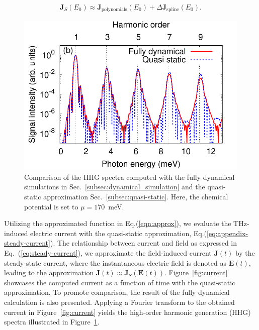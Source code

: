 \begin{align}
	\mathbf J_S(E_0)\approx \mathbf{J}_{\mathrm{polynomials }}(E_0)+\Delta \mathbf{J}_{\mathrm{spline}}(E_0).
	\label{eqn:approx}
\end{align}

\begin{figure}[htbp]
	\centering
	\includegraphics[width=0.8\linewidth]{pic/hhg_qstatic.pdf}
	\caption{\label{fig:hhg_qstatic}
		Comparison of the HHG spectra computed with the fully dynamical simulations in Sec.~\ref{subsec:dynamical_simulation} and the quasi-static approximation Sec.~\ref{subsec:quasi-static}. Here, the chemical potential is set to $\mu =170$~meV.}
\end{figure}

Utilizing the approximated function in Eq.(\ref{eqn:approx}), we evaluate the THz-induced electric
current with the quasi-static approximation, Eq.(\ref{eq:appendix-steady-current}).
The relationship between current and field as expressed in Eq.~(\ref{eq:steady-current}), we approximate the field-induced current $\mathbf J(t)$ by the steady-state current, where the instantaneous electric field is denoted as $\mathbf E(t)$, leading to the approximation $\mathbf J(t)\approx \mathbf J_S\left( \mathbf E(t) \right)$.
Figure~\ref{fig:current} showcases the computed current as a function of time with the quasi-static
approximation. To promote comparison, the result of the fully dynamical calculation is also
presented. Applying a Fourier transform to the obtained current in Figure~\ref{fig:current} yields
the high-order harmonic generation (HHG) spectra illustrated in Figure~\ref{fig:hhg_qstatic}.


